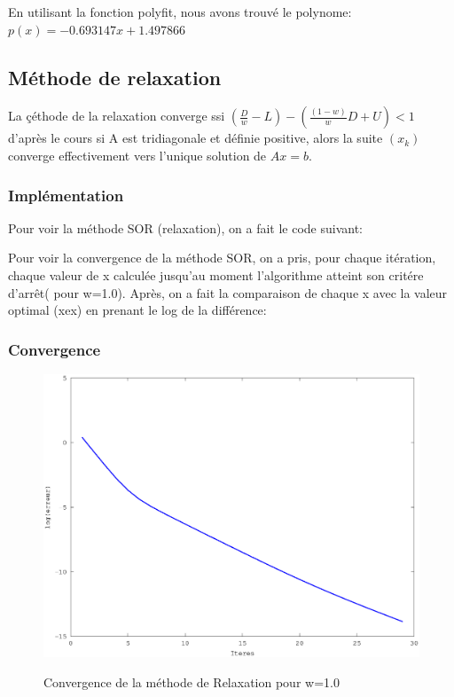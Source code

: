 \documentclass[a4paper,11pt]{article}
\begin{document}
En utilisant la fonction polyfit, nous avons trouvé le polynome: 
$p(x)= -0.693147 x + 1.497866  $


\subsection{Méthode de relaxation}

La çéthode de la relaxation converge ssi $(\frac{D}{w}-L)-(\frac{(1-w)}{w} D + U) <1$ d'après le
cours si A est tridiagonale et définie positive, alors la suite $(x_k)$ converge effectivement vers l'unique solution de $Ax=b$.

\subsubsection{Implémentation}
Pour voir la méthode SOR (relaxation), on a fait le code suivant:

\begin{multicols}{2}
  
\end{multicols}

Pour voir la convergence de la méthode SOR, on a pris, pour chaque
itération, chaque valeur de x
calculée jusqu'au moment l'algorithme atteint son critére d'arrêt( pour w=1.0). Après, on a fait la comparaison de
chaque x avec la valeur optimal (xex) en prenant le log de la différence:


\subsubsection{Convergence}
\begin{figure}[h!]
  \begin{centering}
    \includegraphics[scale=0.5]{../relaxation_graph}
    \label{rspro2}
    \par\end{centering}
  \caption{Convergence de la méthode de Relaxation pour w=1.0}
  \label{fig:jacobi-conv}
\end{figure}
\end{document}
